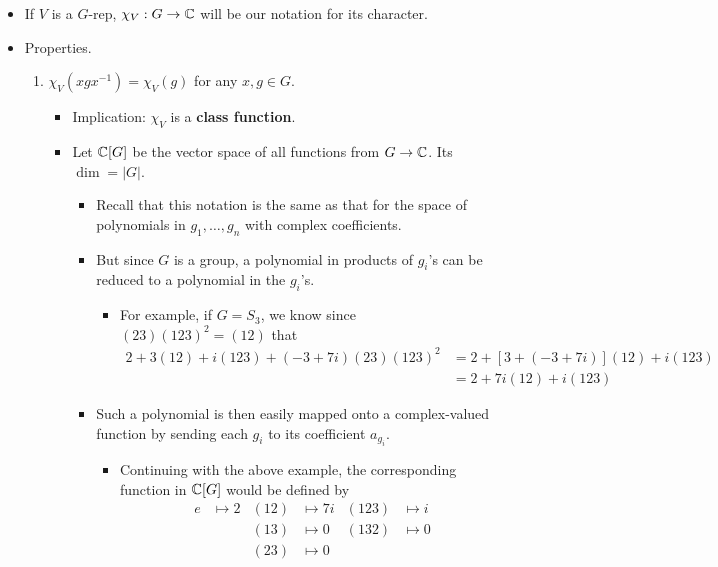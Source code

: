 \documentclass[../notes.tex]{subfiles}
\begin{document}
\begin{itemize}
    \item If $V$ is a $G$-rep, $\chi_V:G\to\mathbb{C}$ will be our notation for its character.
    \item Properties.
    \begin{enumerate}
        \item $\chi_V(xgx^{-1})=\chi_V(g)$ for any $x,g\in G$.
        \begin{itemize}
            \item Implication: $\chi_V$ is a \textbf{class function}.
            \item Let $\mathbb{C}[G]$ be the vector space of all functions from $G\to\mathbb{C}$. Its $\dim=|G|$.
            \begin{itemize}
                \item Recall that this notation is the same as that for the space of polynomials in $g_1,\dots,g_n$ with complex coefficients.
                \item But since $G$ is a group, a polynomial in products of $g_i$'s can be reduced to a polynomial in the $g_i$'s.
                \begin{itemize}
                    \item For example, if $G=S_3$, we know since $(23)(123)^2=(12)$ that
                    \begin{align*}
                        2+3(12)+i(123)+(-3+7i)(23)(123)^2 &= 2+[3+(-3+7i)](12)+i(123)\\
                        &= 2+7i(12)+i(123)
                    \end{align*}
                \end{itemize}
                \item Such a polynomial is then easily mapped onto a complex-valued function by sending each $g_i$ to its coefficient $a_{g_i}$.
                \begin{itemize}
                    \item Continuing with the above example, the corresponding function in $\mathbb{C}[G]$ would be defined by
                    \begin{align*}
                        e &\mapsto 2&
                            (12) &\mapsto 7i&
                                (123) &\mapsto i\\
                        &&
                            (13) &\mapsto 0&
                                (132) &\mapsto 0\\
                        &&
                            (23) &\mapsto 0
                    \end{align*}

\end{itemize}
\end{itemize}
\end{itemize}
\end{enumerate}
\end{itemize}
\end{document}

